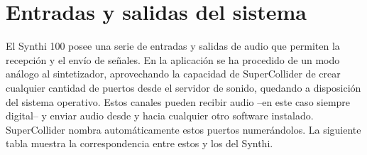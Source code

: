 \section{Entradas y salidas del sistema}

El Synthi 100 posee una serie de entradas y salidas de audio que permiten la recepción y el envío de señales. En la aplicación se ha procedido de un modo análogo al sintetizador, aprovechando la capacidad de SuperCollider de crear cualquier cantidad de puertos desde el servidor de sonido, quedando a disposición del sistema operativo. Estos canales pueden recibir audio --en este caso siempre digital-- y enviar audio desde y hacia cualquier otro software instalado. SuperCollider nombra automáticamente estos puertos numerándolos. La siguiente tabla muestra la correspondencia entre estos y los del Synthi. 

